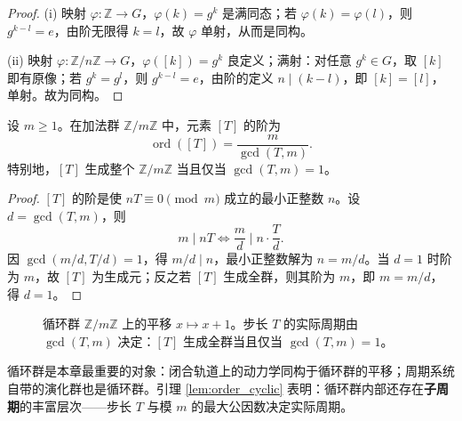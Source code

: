 \begin{proof}
(i) 映射 $\varphi:\mathbb{Z}\to G$，$\varphi(k)=g^k$ 是满同态；若 $\varphi(k)=\varphi(l)$，则 $g^{k-l}=e$，由阶无限得 $k=l$，故 $\varphi$ 单射，从而是同构。

(ii) 映射 $\varphi:\mathbb{Z}/n\mathbb{Z}\to G$，$\varphi([k])=g^k$ 良定义；满射：对任意 $g^k\in G$，取 $[k]$ 即有原像；若 $g^k=g^l$，则 $g^{k-l}=e$，由阶的定义 $n\mid(k-l)$，即 $[k]=[l]$，单射。故为同构。
\end{proof}

\begin{lemma}[有限循环群中元素的阶]\label{lem:order_cyclic}
设 $m\ge 1$。在加法群 $\mathbb{Z}/m\mathbb{Z}$ 中，元素 $[T]$ 的阶为
\[
\operatorname{ord}([T])=\frac{m}{\gcd(T,m)}.
\]
特别地，$[T]$ 生成整个 $\mathbb{Z}/m\mathbb{Z}$ 当且仅当 $\gcd(T,m)=1$。
\end{lemma}

\begin{proof}
$[T]$ 的阶是使 $nT\equiv 0\pmod m$ 成立的最小正整数 $n$。设 $d=\gcd(T,m)$，则
\[
m\mid nT \iff \frac{m}{d}\mid n\cdot\frac{T}{d}.
\]
因 $\gcd(m/d,T/d)=1$，得 $m/d\mid n$，最小正整数解为 $n=m/d$。当 $d=1$ 时阶为 $m$，故 $[T]$ 为生成元；反之若 $[T]$ 生成全群，则其阶为 $m$，即 $m=m/d$，得 $d=1$。
\end{proof}

\begin{figure}[htbp]
\centering
{}
\caption{循环群 $\mathbb Z/m\mathbb Z$ 上的平移 $x\mapsto x+1$。步长 $T$ 的实际周期由 $\gcd(T,m)$ 决定：$[T]$ 生成全群当且仅当 $\gcd(T,m)=1$。}
\label{fig:cyclic_order}
\end{figure}

\begin{remark}\label{rem:cyclic_prototype}
循环群是本章最重要的对象：闭合轨道上的动力学同构于循环群的平移；周期系统自带的演化群也是循环群。引理 \ref{lem:order_cyclic} 表明：循环群内部还存在\textbf{子周期}的丰富层次——步长 $T$ 与模 $m$ 的最大公因数决定实际周期。
\end{remark}

